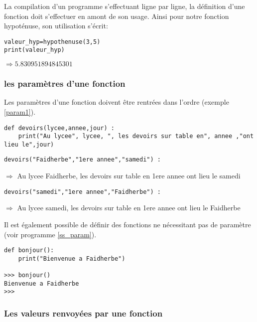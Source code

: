 La compilation d'un programme s'effectuant ligne par ligne, la définition d'une fonction doit s'effectuer en amont de son usage.
Ainsi pour notre fonction hypoténuse, son utilisation s'écrit:

\begin{lstlisting}[frame=lines]
valeur_hyp=hypothenuse(3,5)
print(valeur_hyp)
\end{lstlisting}
$\Rightarrow 5.830951894845301$

\subsubsection{les paramètres d'une fonction}

Les paramètres d'une fonction doivent être rentrées dans l'ordre (exemple \ref{param1}).

\begin{lstlisting}[frame=lines,float=h,caption={l'usage des paramètres},label=param1]
def devoirs(lycee,annee,jour) :
    print("Au lycee", lycee, ", les devoirs sur table en", annee ,"ont lieu le",jour)
\end{lstlisting}

\begin{lstlisting}[frame=lines]
devoirs("Faidherbe","1ere annee","samedi") :  
\end{lstlisting}
$\Rightarrow$ Au lycee Faidherbe, les devoirs sur table en 1ere annee ont lieu le samedi

\begin{lstlisting}[frame=lines]
devoirs("samedi","1ere annee","Faidherbe") :  
\end{lstlisting}
$\Rightarrow$ Au lycee samedi, les devoirs sur table en 1ere annee ont lieu le Faidherbe
\\

\par Il est également possible de définir des fonctions ne nécessitant pas de paramètre (voir programme \ref{ss_param}).

\begin{lstlisting}[frame=lines,caption={une fonction sans paramètre},label=ss_param]
def bonjour():
    print("Bienvenue a Faidherbe")
    
>>> bonjour()
Bienvenue a Faidherbe
>>>     
\end{lstlisting}


\subsubsection{Les valeurs renvoyées par une fonction}

